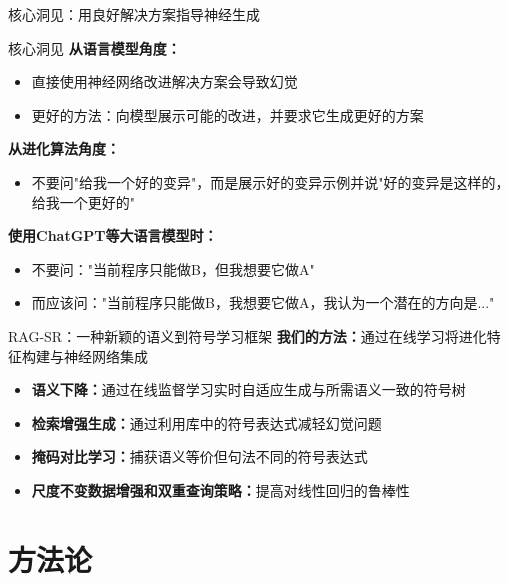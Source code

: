 \documentclass[aspectratio=1610]{beamer}
\begin{document}
    \begin{frame}{核心洞见：用良好解决方案指导神经生成}
        \begin{alertblock}{核心洞见}
            \textbf{从语言模型角度：}
            \begin{itemize}
                \item 直接使用神经网络改进解决方案会导致幻觉
                \item 更好的方法：向模型展示可能的改进，并要求它生成更好的方案
            \end{itemize}

            \textbf{从进化算法角度：}
            \begin{itemize}
                \item 不要问"给我一个好的变异"，而是展示好的变异示例并说"好的变异是这样的，给我一个更好的"
            \end{itemize}

            \textbf{使用ChatGPT等大语言模型时：}
            \begin{itemize}
                \item 不要问："当前程序只能做B，但我想要它做A"
                \item 而应该问："当前程序只能做B，我想要它做A，我认为一个潜在的方向是..."
            \end{itemize}
        \end{alertblock}
    \end{frame}


    \begin{frame}{RAG-SR：一种新颖的语义到符号学习框架}
        \textbf{我们的方法：}通过在线学习将进化特征构建与神经网络集成

        \begin{itemize}
            \item \textbf{语义下降：}通过在线监督学习实时自适应生成与所需语义一致的符号树

            \item \textbf{检索增强生成：}通过利用库中的符号表达式减轻幻觉问题

            \item \textbf{掩码对比学习：}捕获语义等价但句法不同的符号表达式

            \item \textbf{尺度不变数据增强和双重查询策略：}提高对线性回归的鲁棒性
        \end{itemize}
    \end{frame}


    \section{方法论}
\end{document}
